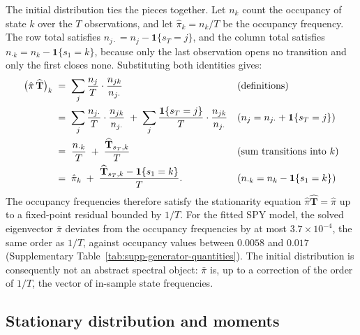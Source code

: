 The initial distribution ties the pieces together. Let
$n_k$ count the occupancy of state $k$ over the $T$ observations, and
let $\hat\pi_k = n_k / T$ be the occupancy frequency. The row total
satisfies $n_{j\cdot} = n_j - \mathbf{1}\{s_T = j\}$, and the column
total satisfies
$n_{\cdot k} = n_k - \mathbf{1}\{s_1 = k\}$, because only the last
observation opens no transition and only the first closes none.
Substituting both identities gives:
\begin{align}
  \big(\hat\pi\, \widehat{\mathbf{T}}\big)_k
   &\;=\; \sum_j \frac{n_j}{T} \cdot \frac{n_{jk}}{n_{j \cdot}}
     && \text{(definitions)} \notag \\
   &\;=\; \sum_j \frac{n_{j \cdot}}{T} \cdot \frac{n_{jk}}{n_{j \cdot}}
     \;+\; \sum_j \frac{\mathbf{1}\{s_T = j\}}{T}
       \cdot \frac{n_{jk}}{n_{j \cdot}}
     && \text{($n_j = n_{j\cdot} + \mathbf{1}\{s_T = j\}$)} \notag \\
   &\;=\; \frac{n_{\cdot k}}{T}
     \;+\; \frac{\widehat{\mathbf{T}}_{s_T, k}}{T}
     && \text{(sum transitions into $k$)} \notag \\
   &\;=\; \hat\pi_k
     \;+\; \frac{\widehat{\mathbf{T}}_{s_T, k}
       - \mathbf{1}\{s_1 = k\}}{T}.
     && \text{($n_{\cdot k} = n_k - \mathbf{1}\{s_1 = k\}$)}
  \label{eq:supp-fixed-point}
\end{align}
The occupancy frequencies therefore satisfy the stationarity equation
$\hat\pi \widehat{\mathbf{T}} = \hat\pi$ up to a fixed-point residual
bounded by $1/T$. For the fitted SPY model, the solved eigenvector
$\bar\pi$ deviates from the occupancy frequencies by at most $3.7
\times 10^{-4}$, the same order as $1/T$, against occupancy values
between $0.0058$ and $0.017$ (Supplementary Table~\ref{tab:supp-generator-quantities}). The
initial distribution is consequently not an abstract spectral object:
$\bar\pi$ is, up to a correction of the order of $1/T$, the vector of
in-sample state frequencies.

\subsection{Stationary distribution and moments}
\label{sec:supp-gen-moments}

